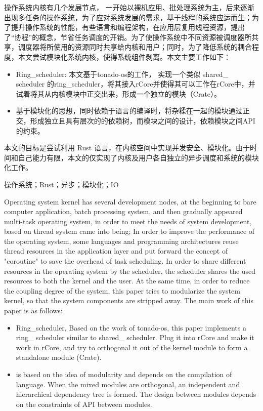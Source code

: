 \setlength{\headheight}{1.5cm}

\abstractcn


操作系统内核有几个发展节点， 一开始以裸机应用、批处理系统为主，后来逐渐出现多任务的操作系统，为了应对系统发展的需求，基于线程的系统应运而生；为了提升操作系统的性能，有些语言和编程架构，在应用层复用线程资源，提出了“协程”的概念，节省任务调度的开销。为了使操作系统中不同资源被调度器所共享，调度器将所使用的资源同时共享给内核和用户；同时，为了降低系统的耦合程度，本文尝试模块化系统内核，使得系统组件剥离。本文主要工作如下：

\begin{itemize}
\item Ring\_scheduler: 本文基于tonado-os的工作， 实现一个类似 shared\_ scheduler 的ring\_scheduler，将其接入rCore并使得其可以工作在rCore中，并试着将其从内核模块中正交出来，形成一个独立的模块（Crate）。 

\item 基于模块化的思想，同时依赖于语言的编译时，将杂糅在一起的模块通过正交，形成独立且具有层次的的依赖树，而模块之间的设计，依赖模块之间API的约束。
\end{itemize}


本文的目标是尝试利用 Rust 语言，在内核空间中实现并发安全、模块化。由于时间和自己能力有限，本文的仅实现了内核及用户各自独立的异步调度和系统的模块化工作。

\keywordscn\quad 操作系统；Rust；异步；模块化；IO
\abstracten

Operating system kernel has several development nodes, at the beginning to bare computer application, batch processing system, and then gradually appeared multi-task operating system, in order to meet the needs of system development, based on thread system came into being; In order to improve the performance of the operating system, some languages and programming architectures reuse thread resources in the application layer and put forward the concept of "coroutine" to save the overhead of task scheduling. In order to share different resources in the operating system by the scheduler, the scheduler shares the used resources to both the kernel and the user. At the same time, in order to reduce the coupling degree of the system, this paper tries to modularize the system kernel, so that the system components are stripped away. The main work of this paper is as follows:

\begin{itemize}
\item Ring\_scheduler, Based on the work of tonado-os, this paper implements a ring\_ scheduler similar to shared\_ scheduler. Plug it into rCore and make it work in rCore, and try to orthogonal it out of the kernel module to form a standalone module (Crate).

\item is based on the idea of modularity and depends on the compilation of language. When the mixed modules are orthogonal, an independent and hierarchical dependency tree is formed. The design between modules depends on the constraints of API between modules.
\end{itemize}

